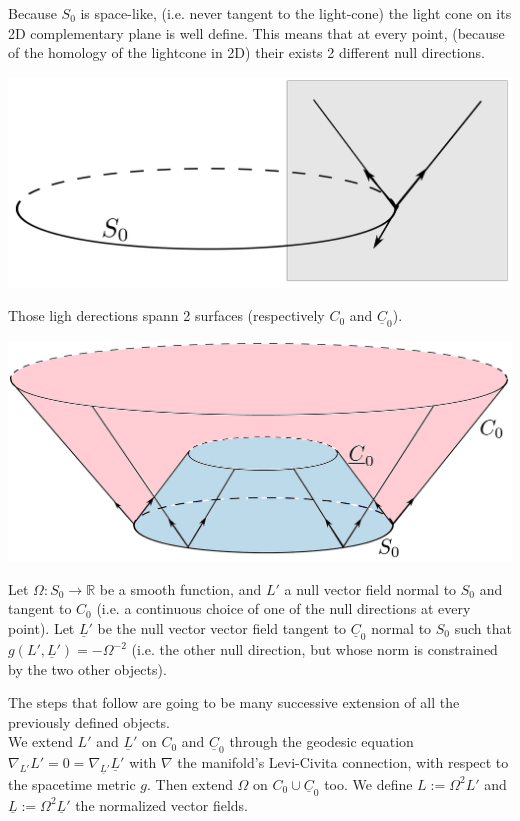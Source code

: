 \documentclass[a4paper,11pt]{article}
\numberwithin{equation}{section}
\theoremstyle{definition}
\begin{document}
Because $S_0$ is space-like, (i.e. never tangent to the light-cone) the light cone on its 2D complementary plane is well define. This means that at every point, (because of the homology of the lightcone in 2D) their exists 2 different null directions. 
\begin{center}
    \includegraphics [width=0.75\linewidth] {Pictures/00_Start.png}
\end{center}
Those ligh derections spann 2 surfaces (respectively $C_0$ and $\underline{C}_0$).
\begin{center}
    \includegraphics [width=0.75\linewidth] {Pictures/01_Surface.png}
\end{center}

Let $\Omega: S_0 \to \mathbb{R}$ be a smooth function, and $L'$ a null vector field normal to $S_0$ and tangent to $C_0$ (i.e. a continuous choice of one of the null directions at every point). Let $\underline{L}'$ be the null vector vector field tangent to $\underline{C}_0$ normal to $S_0$ such that $g(L',\underline{L}')=-\Omega^{-2}$ (i.e. the other null direction, but whose norm is constrained by the two other objects).

The steps that follow are going to be many successive extension of all the previously defined objects.\\
We extend $L'$ and $\underline{L}'$ on $C_0$ and $\underline{C}_0$ through the geodesic equation $\nabla_{L'}L'=0=\nabla_{\underline{L}'}\underline{L}'$ with $\nabla$ the manifold's Levi-Civita connection, with respect to the spacetime metric $g$. Then extend $\Omega$ on $C_0\cup\underline{C}_0$ too. We define $L:=\Omega^2L'$ and $\underline{L} :=\Omega^2 \underline{L}'$ the normalized vector fields.
\end{document}

